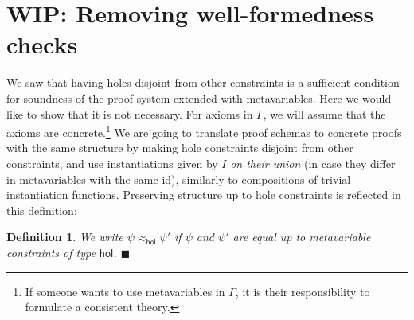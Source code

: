 \documentclass{article}
\newcommand{\xqed}[1]{%
    \leavevmode\unskip\penalty9999 \hbox{}\nobreak\hfill
    \quad\hbox{\ensuremath{#1}}}
\newcommand{\xqedhere}{\xqed{\blacksquare}}
\newtheorem{deff}{Definition}
\newenvironment{definition}[1]{%
  \begin{deff}#1}{%
  \xqedhere\end{deff}%
}
\numberwithin{deff}{section}
\numberwithin{lemma*}{section}
\newtheorem{theorem*}{Theorem}
\newcommand{\Hol}{\mathsf{hol}}
\begin{document}
\iffalse
\begin{theorem*}
  If a proof schema of $\psi$ contains meta-variables that have holes disjoint from other constraints, then there is a schema of $\psi' \approx \psi$ that is not void and metavariable-consistent.
  \begin{proof}
    The main idea is to  and apply \Cref{theorem:disjoint_instantiability}.

    By structural induction on the proof of $\varphi$.

    \paragraph{Base.} $\varphi$ is an axiom. Simply pick the maximal of metavariables as fixed and change the rest to make $\varphi$ metavariable-consistent. This schema is not void by \Cref{theorem:disjoint_instantiability}, and also $\varphi$ is metavariable-consistent.

    \paragraph{Step.} Let us do a case analysis:
    \begin{itemize}
      \item Axiom. Same as Base.
      \item MP. $\psi$, $\psi \to \varphi$ by IH there are non-void proof schemas of $\psi'$ and $\psi' \to \varphi'$ with metavariable-consistent patterns, simply merge them and derive $\varphi'$, for which both these assumptions hold by IH.

    \end{itemize}

  \end{proof}
\end{theorem*}
\fi

\section{WIP: Removing well-formedness checks}

We saw that having holes disjoint from other constraints is a sufficient condition for soundness of the proof system extended with metavariables.
Here we would like to show that it is not necessary.
For axioms in $\Gamma$, we will assume that the axioms are concrete.\footnote{If someone wants to use metavariables in $\Gamma$, it is their responsibility to formulate a consistent theory.}
We are going to translate proof schemas to concrete proofs with the same structure by making hole constraints disjoint from other constraints, and use instantiations given by $I$ \emph{on their union} (in case they differ in metavariables with the same id), similarly to compositions of trivial instantiation functions.
Preserving structure up to hole constraints is reflected in this definition:
\begin{definition}
  We write $\psi \approx_\Hol \psi'$ if $\psi$ and $\psi'$ are equal up to metavariable constraints of type $\Hol$.
\end{definition}
\end{document}
